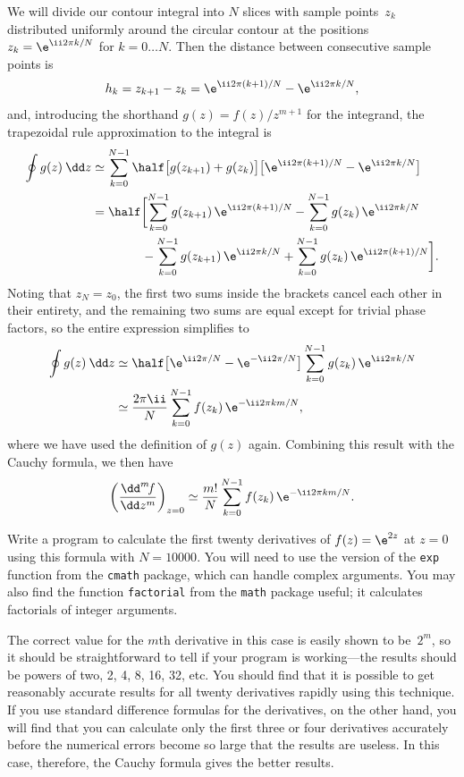 \documentclass[12pt]{article}
\begin{document}
\begin{exercises}
We will divide our contour integral into $N$ slices with sample
points~$z_k$ distributed uniformly around the circular contour at the
positions $z_k = \e^{\ii 2\pi k/N}$ for $k=0\ldots N$.  Then the distance
between consecutive sample points is
\begin{displaymath}
h_k = z_{k+1} - z_k = \e^{\ii 2\pi(k+1)/N} - \e^{\ii 2\pi k/N},
\end{displaymath}
and, introducing the shorthand $g(z)=f(z)/z^{m+1}$ for the integrand, the
trapezoidal rule approximation to the integral is
\begin{align*}
\oint g(z) \>\dd z
  &\simeq \sum_{k=0}^{N-1} \half \bigl[ g(z_{k+1}) + g(z_k) \bigr]
          \bigl[ \e^{\ii 2\pi(k+1)/N} - \e^{\ii 2\pi k/N} \bigr] \\
  &= \half \biggl[ \sum_{k=0}^{N-1} g(z_{k+1})\,\e^{\ii 2\pi(k+1)/N}
                   - \sum_{k=0}^{N-1} g(z_k)\,\e^{\ii 2\pi k/N} \\
  &\hspace{4em}{}  - \sum_{k=0}^{N-1} g(z_{k+1})\,\e^{\ii 2\pi k/N}
                   + \sum_{k=0}^{N-1} g(z_k)\,\e^{\ii 2\pi(k+1)/N}
           \biggr].
\end{align*}
Noting that $z_N=z_0$, the first two sums inside the brackets cancel each
other in their entirety, and the remaining two sums are equal except for
trivial phase factors, so the entire expression simplifies to
\begin{align*}
\oint g(z) \>\dd z
  &\simeq \half \bigl[ \e^{\ii2\pi/N}-\e^{-\ii2\pi/N} \bigr]
          \sum_{k=0}^{N-1} g(z_k)\,\e^{\ii2\pi k/N} \\
  &\simeq {2\pi\ii\over N} \sum_{k=0}^{N-1} f(z_k)\,\e^{-\ii2\pi km/N},
\end{align*}
where we have used the definition of $g(z)$ again.  Combining this result
with the Cauchy formula, we then have
\begin{displaymath}
\biggl( {\dd^m\!f\over\dd z^m} \biggr)_{z=0}
  \simeq {m!\over N} \sum_{k=0}^{N-1} f(z_k)\,\e^{-\ii2\pi km/N}.
\end{displaymath}

Write a program to calculate the first twenty derivatives of $f(z)=\e^{2z}$
at $z=0$ using this formula with $N=10000$.  You will need to use the
version of the \verb|exp| function from the \verb|cmath| package, which can
handle complex arguments.  You may also find the function \verb|factorial|
from the \verb|math| package useful; it calculates factorials of integer
arguments.

The correct value for the $m$th derivative in this case is easily shown to
be~$2^m$, so it should be straightforward to tell if your program is
working---the results should be powers of two, 2, 4, 8, 16, 32, etc.  You
should find that it is possible to get reasonably accurate results for all
twenty derivatives rapidly using this technique.  If you use standard
difference formulas for the derivatives, on the other hand, you will find
that you can calculate only the first three or four derivatives accurately
before the numerical errors become so large that the results are useless.
In this case, therefore, the Cauchy formula gives the better results.


\end{exercises}
\end{document}
